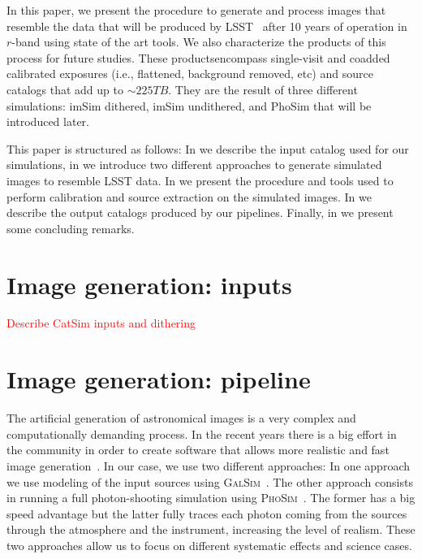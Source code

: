 \documentclass[\docopts]{\docclass}
\begin{document}
In this paper, we present the procedure to generate and process images that resemble the data that will be produced by
LSST~\citep{2008arXiv0805.2366I} after 10 years of operation in $r$-band using state of the art tools. We also characterize
the products of this process for future studies. These productsencompass single-visit and coadded calibrated exposures
(i.e., flattened, background removed, etc) and source catalogs that add up to $\sim 225 TB$. They are the result of three
different simulations: imSim dithered, imSim undithered, and PhoSim that will be introduced later.

This paper is structured as follows: In  we describe the input catalog used for our simulations,
in  we introduce two different approaches to generate simulated images to
resemble LSST data. In  we present the procedure and tools used to perform
calibration and source extraction on the simulated images. In  we describe the output catalogs
produced by our pipelines. Finally, in  we present some concluding remarks.

\section{Image generation: inputs}
\label{sec:inputs}

\textcolor{red}{Describe CatSim inputs and dithering}

\section{Image generation: pipeline}
\label{sec:image_generation_pipeline}

The artificial generation of astronomical images is a very complex and computationally demanding process. In the recent
years there is a big effort in the community in order to create software that allows more realistic and fast image
generation~\citep{2016MNRAS.457..786S,2016ApJ...817...25B}. In our case, we use two different approaches: In one approach
we use modeling of the input sources using \textsc{GalSim}~\citep{2015A&C....10..121R}. The other approach consists in
running a full photon-shooting simulation using \textsc{PhoSim}~\citep{2015ApJS..218...14P}. The former has a big speed
advantage but the latter fully traces each photon coming from the sources through the atmosphere and the instrument,
 increasing the level of realism. These two approaches allow us to focus on different systematic effects and science cases.
\end{document}
